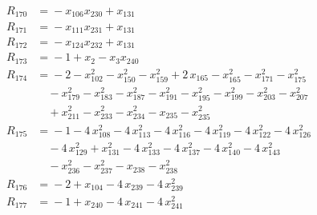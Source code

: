 \begin{align*}
R_{170} &={} -x_{106} x_{230} +x_{131} \\[2pt]
R_{171} &={} -x_{111} x_{231} +x_{131} \\[2pt]
R_{172} &={} -x_{124} x_{232} +x_{131} \\[2pt]
R_{173} &={} -1 +x_{2} -x_{3} x_{240} \\[2pt]
R_{174} &={} -2 -x_{102}^{2} -x_{150}^{2} -x_{159}^{2} +2\,x_{165} -x_{165}^{2} -x_{171}^{2} -x_{175}^{2} \\
&\quad{} -x_{179}^{2} -x_{183}^{2} -x_{187}^{2} -x_{191}^{2} -x_{195}^{2} -x_{199}^{2} -x_{203}^{2} -x_{207}^{2} \\
&\quad{} +x_{211}^{2} -x_{233}^{2} -x_{234}^{2} -x_{235} -x_{235}^{2} \\[2pt]
R_{175} &={} -1 -4\,x_{108}^{2} -4\,x_{113}^{2} -4\,x_{116}^{2} -4\,x_{119}^{2} -4\,x_{122}^{2} -4\,x_{126}^{2} \\
&\quad{} -4\,x_{129}^{2} +x_{131}^{2} -4\,x_{133}^{2} -4\,x_{137}^{2} -4\,x_{140}^{2} -4\,x_{143}^{2} \\
&\quad{} -x_{236}^{2} -x_{237}^{2} -x_{238} -x_{238}^{2} \\[2pt]
R_{176} &={} -2 +x_{104} -4\,x_{239} -4\,x_{239}^{2} \\[2pt]
R_{177} &={} -1 +x_{240} -4\,x_{241} -4\,x_{241}^{2}
\end{align*}
